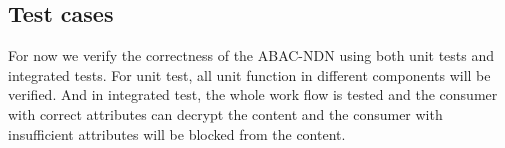 \subsection{Test cases}
For now we verify the correctness of the ABAC-NDN using both unit tests and integrated tests. For unit test, all unit function in different components will be verified. And in integrated test, the whole work flow is tested and the consumer with correct attributes can decrypt the content and the consumer with insufficient attributes will be blocked from the content.